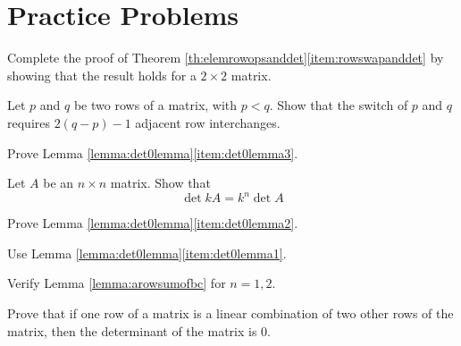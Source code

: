 \documentclass{ximera}
\begin{document}
\section*{Practice Problems}

\begin{problem}\label{prob:proofofrowswapanddet}
Complete the proof of Theorem \ref{th:elemrowopsanddet}\ref{item:rowswapanddet} by showing that the result holds for a $2\times 2$ matrix.
\end{problem}

\begin{problem}\label{prob:numberofrowswitches}
Let $p$ and $q$ be two rows of a matrix, with $p<q$.  Show that the switch of $p$ and $q$ requires $2(q-p)-1$ adjacent row interchanges.
\end{problem}

\begin{problem}\label{prob:proofdet0lemma}
Prove Lemma \ref{lemma:det0lemma}\ref{item:det0lemma3}.
\end{problem}



\begin{problem}\label{prob:kAdet}
Let $A$ be an $n\times n$ matrix.  Show that 
$$\det{kA}=k^n\det{A}$$
\end{problem}

\begin{problem}\label{prob:proofdet0lemma2}
Prove Lemma \ref{lemma:det0lemma}\ref{item:det0lemma2}.
\begin{hint}Use Lemma \ref{lemma:det0lemma}\ref{item:det0lemma1}.
\end{hint}
\end{problem}

\begin{problem}\label{prob:lemma2proof}
Verify Lemma \ref{lemma:arowsumofbc} for $n=1, 2$.
\end{problem}

\begin{problem}\label{prob:onerowlincombanotherdet}
Prove that if one row of a matrix is a linear combination of two other rows of the matrix, then the determinant of the matrix is 0.
\end{problem}
\end{document}

